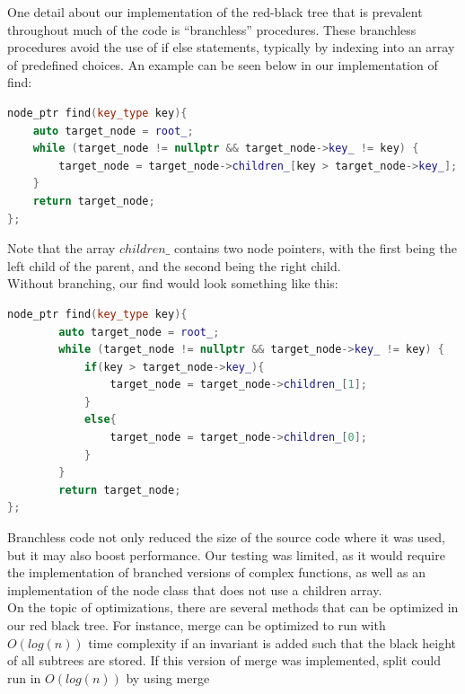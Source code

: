 \documentclass{article}
\begin{document}
\noindent
One detail about our implementation of the red-black tree that is prevalent throughout much of the code is “branchless” procedures. These branchless procedures avoid the use of if else statements, typically by indexing into an array of predefined choices. An example can be seen below in our implementation of find:
\\

\begin{lstlisting}[language=C++,basicstyle=\tiny]
node_ptr find(key_type key){
    auto target_node = root_;
    while (target_node != nullptr && target_node->key_ != key) {
        target_node = target_node->children_[key > target_node->key_];
    }
    return target_node;
};
\end{lstlisting}

\noindent
Note that the array $children\_$ contains two node pointers, with the first being the left child of the parent, and the second being the right child.
\\

\noindent
Without branching, our find would look something like this:

\begin{lstlisting}[language=C++,basicstyle=\tiny]
node_ptr find(key_type key){
        auto target_node = root_;
        while (target_node != nullptr && target_node->key_ != key) {
            if(key > target_node->key_){
                target_node = target_node->children_[1];
            }
            else{
                target_node = target_node->children_[0];
            }
        }
        return target_node;
};
\end{lstlisting}

\noindent
Branchless code not only reduced the size of the source code where it was used, but it may also boost performance. Our testing was limited, as it would require the implementation of branched versions of complex functions, as well as an implementation of the node class that does not use a children array.
\\

\noindent
On the topic of optimizations, there are several methods that can be optimized in our red black tree. For instance, merge can be optimized to run with $O(log(n))$ time complexity if an invariant is added such that the black height of all subtrees are stored. If this version of merge was implemented, split could run in $O(log(n))$ by using merge \cite{rbtreejoin}
\\
\end{document}
